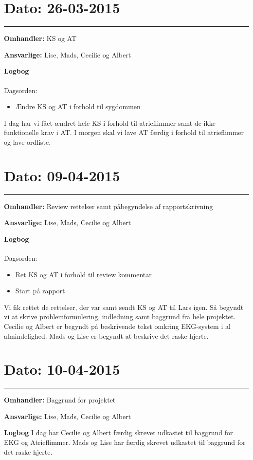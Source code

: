 \section{Dato: 26-03-2015}
\hrule 

\textbf{Omhandler:} KS og AT 

\textbf{Ansvarlige:} Lise, Mads, Cecilie og Albert
 
\textbf{Logbog}
\\
\\
Dagsorden:
\begin{itemize}
	\item Ændre KS og AT i forhold til sygdommen
\end{itemize}

I dag har vi fået ændret hele KS i forhold til atrieflimmer samt de ikke-funktionelle krav i AT. 
I morgen skal vi lave AT færdig i forhold til atrieflimmer og lave ordliste. 


\section{Dato: 09-04-2015}
\hrule 

\textbf{Omhandler:} Review rettelser samt påbegyndelse af rapportskrivning 

\textbf{Ansvarlige:} Lise, Mads, Cecilie og Albert 

\textbf{Logbog}
\\
\\
Dagsorden:
\begin{itemize}
	\item Ret KS og AT i forhold til review kommentar 
	\item Start på rapport 
\end{itemize}

Vi fik rettet de rettelser, der var samt sendt KS og AT til Lars igen. 
Så begyndt vi at skrive problemformulering, indledning samt baggrund fra hele projektet. Cecilie og Albert er begyndt på beskrivende tekst omkring EKG-system i al almindelighed. Mads og Lise er begyndt at beskrive det raske hjerte. 

\section{Dato: 10-04-2015}
\hrule 


\textbf{Omhandler:} Baggrund for projektet

\textbf{Ansvarlige:} Lise, Mads, Cecilie og Albert 

\textbf{Logbog}
I dag har Cecilie og Albert færdig skrevet udkastet til baggrund for EKG og Atrieflimmer. 
Mads og Lise har færdig skrevet udkastet til baggrund for det raske hjerte. 


